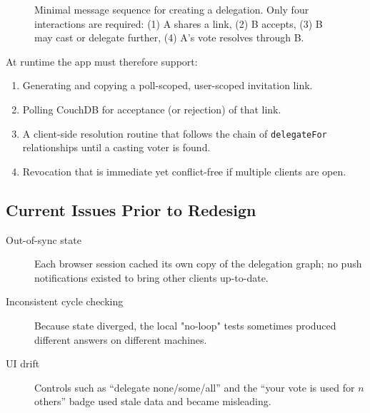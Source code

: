 \begin{figure}[H]
  \centering
  \caption{Minimal message sequence for creating a delegation. Only four interactions are required: (1) A shares a link, (2) B accepts, (3) B may cast or delegate further, (4) A's vote resolves through B.}
  \label{fig:delegation-flow}
\end{figure}

At runtime the app must therefore support:
\begin{enumerate}
  \item Generating and copying a poll-scoped, user-scoped invitation link.
  \item Polling CouchDB for acceptance (or rejection) of that link.
  \item A client-side resolution routine that follows the chain of \texttt{delegateFor} relationships until a casting voter is found.
  \item Revocation that is immediate yet conflict-free if multiple clients are open.
\end{enumerate}

\subsection{Current Issues Prior to Redesign}
\begin{description}
  \item[Out-of-sync state] Each browser session cached its own copy of the delegation graph; no push notifications existed to bring other clients up-to-date.
  \item[Inconsistent cycle checking] Because state diverged, the local "no-loop" tests sometimes produced different answers on different machines.
  \item[UI drift] Controls such as ``delegate none/some/all'' and the ``your vote is used for \(n\) others'' badge used stale data and became misleading.
\end{description}

